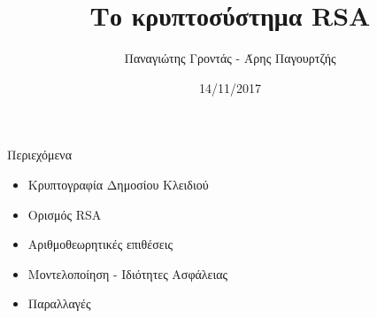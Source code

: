 \documentclass[handout]{beamer}
\title{Το κρυπτοσύστημα RSA}
\author{Παναγιώτης Γροντάς - Άρης Παγουρτζής}
\date{14/11/2017}
\institute{ΕΜΠ - Κρυπτογραφία (2017-2018)}
\begin{document}
\newcommand{\xor}{ \oplus }
\newcommand{\MSG}{ \mathtt{M} }
\newcommand{\KEY}{ \mathtt{K} }
\newcommand{\CPH}{ \mathtt{C} }
\newcommand{\keygen}{\mathtt{KeyGen}}
\newcommand{\enc}{\mathtt{Encrypt}}
\newcommand{\dec}{\mathtt{Decrypt}}
\newcommand{\adv}{$\mathcal{A} \,$ }
\newcommand{\advb}{$\mathcal{B} \,$ }
\newcommand{\chal}{$\mathcal{C} \,$ }
\newcommand{\cs}{$\mathcal{CS} \,$ }
\newcommand{\zns}{  \mathbb{Z}^*_n }
\newcommand{\zn}{  \mathbb{Z}_n }

\newcommand{\green}[1]{\textcolor{teal}{#1}}
\newcommand{\Green}[1]{\textcolor{Teal}{#1}}
\newcommand{\ForestGreen}[1]{\textcolor{ForestGreen}{#1}}
\newcommand{\blue}[1]{\textcolor{blue}{#1}}
\newcommand{\magenta}[1]{\textcolor{magenta}{#1}}
\newcommand{\cyan}[1]{\textcolor{cyan}{#1}}

\newcommand{\twopartdef}[4]
{ 
		\begin{cases}
			#1 , #2 \\
			#3 , #4
		\end{cases} 
}

\begin{frame}
\titlepage
\end{frame}


\npthousandsep{ }
\begin{frame}{Περιεχόμενα}
\begin{itemize}
\item Κρυπτογραφία Δημοσίου Κλειδιού
\pause
\item Ορισμός RSA
\pause
\item Αριθμοθεωρητικές επιθέσεις
\pause
\item Μοντελοποίηση - Ιδιότητες Ασφάλειας
\pause
\item Παραλλαγές
\end{itemize}
\end{frame}
\end{document}
